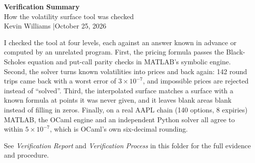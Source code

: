 \documentclass[11pt]{article}
\newcommand{\titleblock}[2]{\begin{center}{\LARGE\bfseries\color{accent}#1}\\[0.4em]{\large #2}\\[0.3em]{\small Kevin Williams \quad|\quad October 25, 2026}\end{center}\vspace{0.3em}}
\begin{document}
\titleblock{Verification Summary}{How the volatility surface tool was checked}

I checked the tool at four levels, each against an answer known in advance or computed by an unrelated program. First, the pricing formula passes the Black-Scholes equation and put-call parity checks in MATLAB's symbolic engine. Second, the solver turns known volatilities into prices and back again: 142 round trips came back with a worst error of $3\times10^{-7}$, and impossible prices are rejected instead of ``solved''. Third, the interpolated surface matches a surface with a known formula at points it was never given, and it leaves blank areas blank instead of filling in zeros. Finally, on a real AAPL chain (140 options, 8 expiries) MATLAB, the OCaml engine and an independent Python solver all agree to within $5\times10^{-7}$, which is OCaml's own six-decimal rounding.

\vfill
{\small See \emph{Verification Report} and \emph{Verification Process} in this folder for the full evidence and procedure.}
\end{document}
